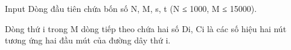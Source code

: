 Input
Dòng đầu tiên chứa bốn số N, M, s, t (N ≤ 1000, M ≤ 15000).


Dòng thứ i trong M dòng tiếp theo chứa hai số Di, Ci là các số hiệu hai nút tương ứng hai đầu mút của đường dây thứ i.